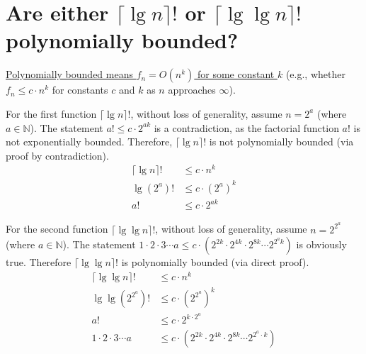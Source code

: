 \section[Problem 1]{Are either $\lceil \lg n \rceil!$ or $\lceil \lg \lg n \rceil!$ polynomially bounded?}

\ul{Polynomially bounded means $f_n = O(n^k)$ for some constant $k$} (e.g., whether $f_n \leq c \cdot n^k$ for constants $c$ and $k$ as $n$ approaches $\infty$). 

For the first function $\lceil \lg n \rceil!$, without loss of generality, assume $n = 2^a$ (where $a \in \mathbb{N}$). 
The statement $a! \leq c \cdot 2^{ak}$ is a contradiction, as the factorial function $a!$ is not exponentially bounded. Therefore, $\lceil \lg n \rceil!$ is not polynomially bounded (via proof by contradiction). 
\begin{align*}
	\lceil \lg n \rceil ! & \leq c \cdot n^k \\
	\lg (2^a) ! & \leq c \cdot (2^a)^k \\
	a! & \leq c \cdot 2^{ak}
\end{align*}


For the second function $\lceil \lg \lg n \rceil!$, without loss of generality, assume $n = 2^{2^a}$ (where $a \in \mathbb{N}$).
The statement $1 \cdot 2 \cdot 3 \cdots a \leq c \cdot \left( 2^{2k} \cdot 2^{4k} \cdot 2^{8k} \cdots 2^{2^a k} \right)$ is obviously true. Therefore $\lceil \lg \lg n \rceil!$ is polynomially bounded (via direct proof).
\begin{align*}
	 \lceil \lg \lg n \rceil! & \leq c \cdot n^k \\
	 \lg \lg \left( 2^{2^a} \right) ! & \leq c \cdot \left( 2^{2^a} \right)^k \\
	 a! & \leq c \cdot 2^{k \cdot {2^a}} \\
	 1 \cdot 2 \cdot 3 \cdots a & \leq c \cdot \left( 2^{2k} \cdot 2^{4k} \cdot 2^{8k} \cdots 2^{2^a \cdot k} \right)
\end{align*}


